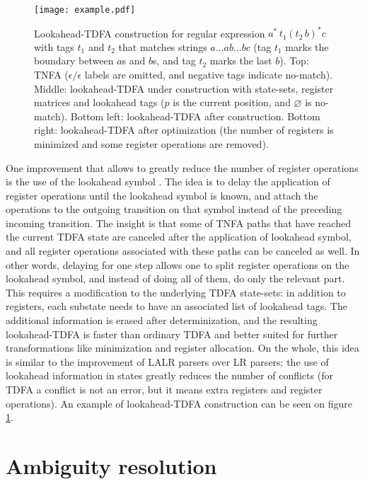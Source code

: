 \documentclass[preprint,12pt, a4paper]{elsarticle}
\begin{document}
\begin{figure}[t!]
\texttt{[image: example.pdf]}
\caption{
Lookahead-TDFA construction for regular expression $a^* \, t_1 (t_2 \, b)^* c \;$ with tags $t_1$ and $t_2$
that matches strings $a \dots a b \dots b c$ (tag $t_1$ marks the boundary between $a$s and $b$s, and tag $t_2$ marks the last $b$).
Top: TNFA ($\epsilon/\epsilon$ labels are omitted, and negative tags indicate no-match).
Middle: lookahead-TDFA under construction with state-sets, register matrices and lookahead tags
($p$ is the current position, and $\varnothing$ is no-match).
Bottom left: lookahead-TDFA after construction.
Bottom right: lookahead-TDFA after optimization (the number of registers is minimized and some register operations are removed).
}\label{fig:example}
\end{figure}

\noindent
One improvement that allows to greatly reduce the number of register operations is the use of the lookahead symbol \cite{Tro17}.
The idea is to delay the application of register operations until the lookahead symbol is known,
and attach the operations to the outgoing transition on that symbol instead of the preceding incoming transition.
The insight is that some of TNFA paths that have reached the current TDFA state are canceled after the application of lookahead symbol,
and all register operations associated with these paths can be canceled as well.
In other words, delaying for one step allows one to split register operations on the lookahead symbol,
and instead of doing all of them, do only the relevant part.
This requires a modification to the underlying TDFA state-sets:
in addition to registers, each substate needs to have an associated list of lookahead tags.
The additional information is erased after determinization,
and the resulting lookahead-TDFA is faster than ordinary TDFA and better suited for further transformations like minimization and register allocation.
On the whole, this idea is similar to the improvement of LALR parsers over LR parsers:
the use of lookahead information in states greatly reduces the number of conflicts
(for TDFA a conflict is not an error, but it means extra registers and register operations).
An example of lookahead-TDFA construction can be seen on figure \ref{fig:example}.


\section{Ambiguity resolution}
\end{document}

